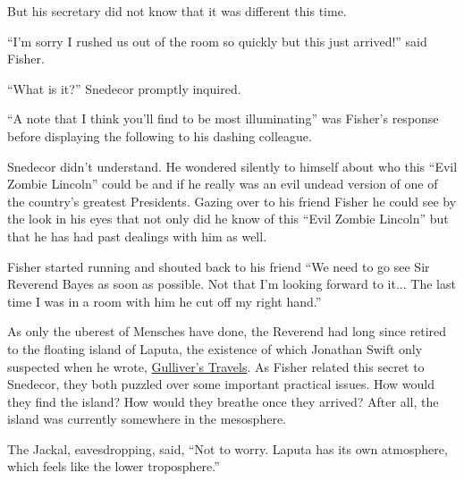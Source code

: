 \documentclass{article}
\begin{document}
But his secretary did not know that it was different this time.


``I'm sorry I rushed us out of the room so quickly but this just arrived!'' said Fisher. 

``What is it?'' Snedecor promptly inquired.

``A note that I think you'll find to be most illuminating'' was Fisher's response before displaying the following to his dashing colleague.

\Fontauri
\large 
\begin{center}
\end{center}

\normalfont
\normalsize
\vspace{.5in}

Snedecor didn't understand.  He wondered silently to himself about who this ``Evil Zombie Lincoln'' could be and if he really was an evil undead version of one of the country's greatest Presidents.  Gazing over to his friend Fisher he could see by the look in his eyes that not only did he know of this ``Evil Zombie Lincoln'' but that he has had past dealings with him as well.

Fisher started running and shouted back to his friend ``We need to go see Sir Reverend Bayes as soon as possible.  Not that I'm looking forward to it... The last time I was in a room with him he cut off my right hand.''


As only the uberest of Mensches have done, the Reverend had long since retired to the floating island of Laputa, the existence of which Jonathan Swift only suspected when he wrote, \underline{Gulliver's Travels}. As Fisher related this secret to Snedecor, they both puzzled over some important practical issues. How would they find the island? How would they breathe once they arrived? After all, the island was currently somewhere in the mesosphere. \newline

The Jackal, eavesdropping, said, ``Not to worry. Laputa has its own atmosphere, which feels like the lower troposphere.'' \newline
\end{document}
